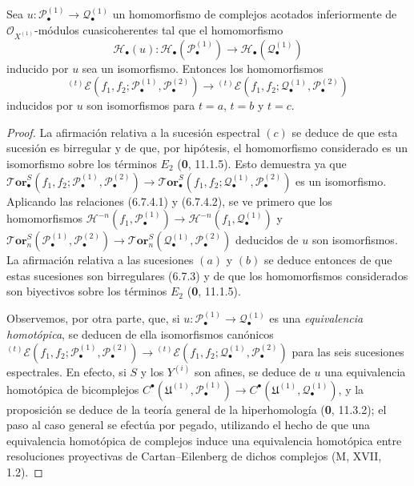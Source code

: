 \begin{proposition}[6.7.5]
\label{III.6.7.5}
Sea $u:\mathscr P_\bullet^{(1)}\to\mathscr Q_\bullet^{(1)}$ un
homomorfismo de complejos acotados inferiormente de
$\mathscr O_{X^{(1)}}$-módulos cuasicoherentes tal que el homomorfismo
\[
  \mathscr H_\bullet(u):
  \mathscr H_\bullet(\mathscr P_\bullet^{(1)})
  \longrightarrow
  \mathscr H_\bullet(\mathscr Q_\bullet^{(1)})
\]
inducido por $u$ sea un isomorfismo. Entonces los homomorfismos
\[
  {}^{(t)}\mathscr E
  (f_1,f_2;\mathscr P_\bullet^{(1)},\mathscr P_\bullet^{(2)})
  \longrightarrow
  {}^{(t)}\mathscr E
  (f_1,f_2;\mathscr Q_\bullet^{(1)},\mathscr P_\bullet^{(2)})
\]
inducidos por $u$ son isomorfismos para $t=a$, $t=b$ y $t=c$.
\end{proposition}

\begin{proof}
La afirmación relativa a la sucesión espectral $(c)$ se deduce de que esta
sucesión es birregular y de que, por hipótesis, el homomorfismo considerado es
un isomorfismo sobre los términos $E_2$ (\textbf{0}, 11.1.5). Esto
demuestra ya que
$
  \boldsymbol{\mathscr{T}\!or}_\bullet^S
  (f_1,f_2;\mathscr P_\bullet^{(1)},\mathscr P_\bullet^{(2)})
  \longrightarrow
  \boldsymbol{\mathscr{T}\!or}_\bullet^S
  (f_1,f_2;\mathscr Q_\bullet^{(1)},\mathscr P_\bullet^{(2)})
$
es un isomorfismo. Aplicando las relaciones (6.7.4.1) y (6.7.4.2), se ve
primero que los homomorfismos
$
  \mathcal H^{-n}(f_1,\mathscr P_\bullet^{(1)})
  \longrightarrow
  \mathcal H^{-n}(f_1,\mathscr Q_\bullet^{(1)})
  $ y $
  \boldsymbol{\mathscr{T}\!or}_n^S
  (\mathscr P_\bullet^{(1)},\mathscr P_\bullet^{(2)})
  \longrightarrow
  \boldsymbol{\mathscr{T}\!or}_n^S
  (\mathscr Q_\bullet^{(1)},\mathscr P_\bullet^{(2)})
$
deducidos de $u$ son isomorfismos. La afirmación relativa a las sucesiones
$(a)$ y $(b)$ se deduce entonces de que estas sucesiones son birregulares
(6.7.3) y de que los homomorfismos considerados son biyectivos sobre los
términos $E_2$ (\textbf{0}, 11.1.5).

Observemos, por otra parte, que, si
$u:\mathscr P_\bullet^{(1)}\to\mathscr Q_\bullet^{(1)}$ es una
\emph{equivalencia homotópica}, se deducen de ella isomorfismos canónicos
$
  {}^{(t)}\mathscr E
  (f_1,f_2;\mathscr P_\bullet^{(1)},\mathscr P_\bullet^{(2)})
  \longrightarrow
  {}^{(t)}\mathscr E
  (f_1,f_2;\mathscr Q_\bullet^{(1)},\mathscr P_\bullet^{(2)})
$
para las seis sucesiones espectrales. En efecto, si $S$ y los $Y^{(i)}$ son
afines, se deduce de $u$ una equivalencia homotópica de bicomplejos
$
  C^\bullet(\mathfrak U^{(1)},\mathscr P_\bullet^{(1)})
  \longrightarrow
  C^\bullet(\mathfrak U^{(1)},\mathscr Q_\bullet^{(1)})$,
y la proposición se deduce de la teoría general de la hiperhomología
(\textbf{0}, 11.3.2); el paso al caso general se efectúa por pegado,
utilizando el hecho de que una equivalencia homotópica de complejos induce
una equivalencia homotópica entre resoluciones proyectivas de
Cartan--Eilenberg de dichos complejos (M, XVII, 1.2).
\end{proof}

